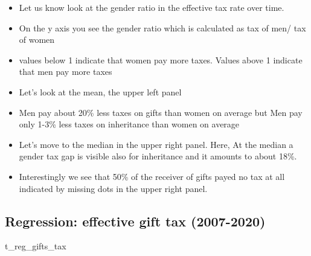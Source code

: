 \documentclass[
  letterpaper,
  DIV=11,
  numbers=noendperiod]{scrartcl}
\newenvironment{Shaded}{\begin{snugshade}}{\end{snugshade}}
\newcommand{\NormalTok}[1]{\textcolor[rgb]{0.00,0.23,0.31}{#1}}
\providecommand{\tightlist}{%
  \setlength{\itemsep}{0pt}\setlength{\parskip}{0pt}}\usepackage{longtable,booktabs,array}
\begin{document}
\begin{itemize}
\tightlist
\item
  Let us know look at the gender ratio in the effective tax rate over
  time.
\item
  On the y axis you see the gender ratio which is calculated as tax of
  men/ tax of women
\item
  values below 1 indicate that women pay more taxes. Values above 1
  indicate that men pay more taxes
\item
  Let's look at the mean, the upper left panel
\item
  Men pay about 20\% less taxes on gifts than women on average but Men
  pay only 1-3\% less taxes on inheritance than women on average
\item
  Let's move to the median in the upper right panel. Here, At the median
  a gender tax gap is visible also for inheritance and it amounts to
  about 18\%.
\item
  Interestingly we see that 50\% of the receiver of gifts payed no tax
  at all indicated by missing dots in the upper right panel.
\end{itemize}

\hypertarget{regression-effective-gift-tax-2007-2020}{%
\subsection{Regression: effective gift tax
(2007-2020)}\label{regression-effective-gift-tax-2007-2020}}

\begin{Shaded}
\begin{Highlighting}[]
\NormalTok{t\_reg\_gifts\_tax }
\end{Highlighting}
\end{Shaded}
\end{document}
